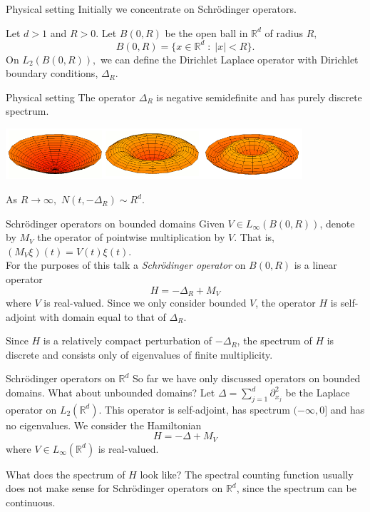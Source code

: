 \documentclass{beamer}
\numberwithin{equation}{section}
\theoremstyle{plain}
\theoremstyle{plain}
\theoremstyle{definition}
\theoremstyle{plain}
\theoremstyle{plain}
\theoremstyle{definition}
\newcommand{\Rl}{\mathbb{R}}
\begin{document}
\begin{frame}{Physical setting}
    Initially we concentrate on Schr\"odinger operators.

    Let $d > 1$ and $R > 0$. Let $B(0,R)$ be the open ball in $\Rl^d$ of radius $R,$
    \begin{equation*}
        B(0,R) = \{x\in \Rl^d\;:\;|x|<R\}.
    \end{equation*}
    \pause
    On $L_2(B(0,R)),$ we can define the Dirichlet Laplace operator with Dirichlet boundary conditions, $\Delta_R.$
\end{frame}

\begin{frame}{Physical setting}
    The operator $\Delta_R$ is negative semidefinite and has purely discrete spectrum.\\
    \begin{center}
    \includegraphics[width=110mm]{vibrating_drum.png}
    \end{center}
    As $R\to\infty,$ $N(t,-\Delta_R) \sim R^d.$
\end{frame}

\begin{frame}{Schr\"odinger operators on bounded domains}
    Given $V \in L_\infty(B(0,R))$, denote by $M_V$ the operator of pointwise multiplication by $V$. That is, $(M_V\xi)(t) = V(t)\xi(t)$. \pause \\
    For the purposes of this talk a \emph{Schr\"odinger operator} on $B(0,R)$ is a linear operator
    $$
        H = -\Delta_R+M_V
    $$
    where $V$ is real-valued. Since we only consider bounded $V$, the operator $H$ is self-adjoint with domain equal to that of $\Delta_R$.\pause
    
    Since $H$ is a relatively compact
    perturbation of $-\Delta_R$, the spectrum of $H$ is discrete and consists only of eigenvalues of finite multiplicity. 
\end{frame}

\begin{frame}{Schr\"odinger operators on $\Rl^d$}
    So far we have only discussed operators on bounded domains. What about unbounded domains?
    Let $\Delta = \sum_{j=1}^d \partial_{x_j}^2$ be the Laplace operator on $L_2(\Rl^d)$. This operator is self-adjoint,
    has spectrum $(-\infty,0]$ and has no eigenvalues. \pause We consider the Hamiltonian 
    $$
        H = -\Delta+M_V
    $$
    where $V \in L_\infty(\Rl^d)$ is real-valued.
    
    What does the spectrum of $H$ look like?  \pause
    The spectral counting function usually does not make sense for Schr\"odinger operators on $\Rl^d$, since the spectrum can be continuous.
\end{frame}
\end{document}
